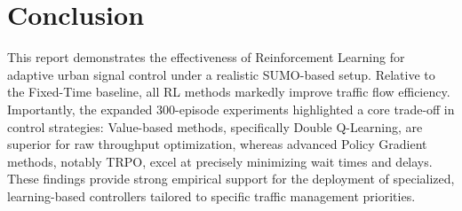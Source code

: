 \documentclass[11pt,a4paper]{article}
\begin{document}
\section{Conclusion}
This report demonstrates the effectiveness of Reinforcement Learning for adaptive urban signal control under a realistic SUMO-based setup. Relative to the Fixed-Time baseline, all RL methods markedly improve traffic flow efficiency. Importantly, the expanded 300-episode experiments highlighted a core trade-off in control strategies: Value-based methods, specifically Double Q-Learning, are superior for raw throughput optimization, whereas advanced Policy Gradient methods, notably TRPO, excel at precisely minimizing wait times and delays. These findings provide strong empirical support for the deployment of specialized, learning-based controllers tailored to specific traffic management priorities.
\end{document}

